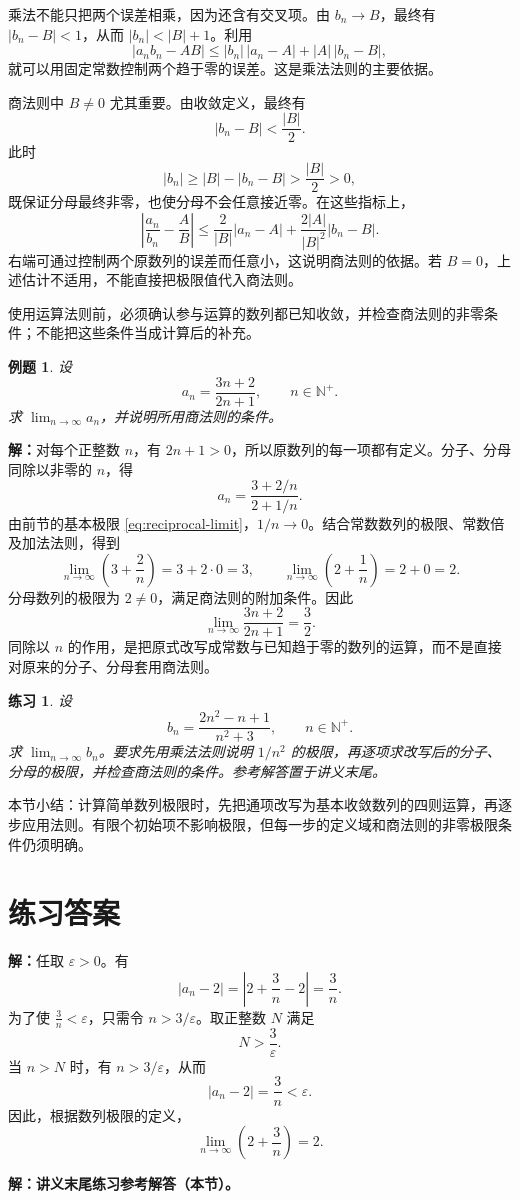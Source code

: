 \documentclass[UTF8,fontset=fandol,11pt]{ctexart}
\newtheorem{example}[definition]{例题}
\newtheorem{exercise}[definition]{练习}
\begin{document}
乘法不能只把两个误差相乘，因为还含有交叉项。由 $b_n\to B$，最终有 $|b_n-B|<1$，从而 $|b_n|<|B|+1$。利用
\[
|a_nb_n-AB|
\leq |b_n|\,|a_n-A|+|A|\,|b_n-B|,
\]
就可以用固定常数控制两个趋于零的误差。这是乘法法则的主要依据。

商法则中 $B\ne0$ 尤其重要。由收敛定义，最终有
\[
|b_n-B|<\frac{|B|}{2}.
\]
此时
\[
|b_n|\geq |B|-|b_n-B|>\frac{|B|}{2}>0,
\]
既保证分母最终非零，也使分母不会任意接近零。在这些指标上，
\[
\left|\frac{a_n}{b_n}-\frac{A}{B}\right|
\leq \frac{2}{|B|}|a_n-A|
+\frac{2|A|}{|B|^2}|b_n-B|.
\]
右端可通过控制两个原数列的误差而任意小，这说明商法则的依据。若 $B=0$，上述估计不适用，不能直接把极限值代入商法则。

使用运算法则前，必须确认参与运算的数列都已知收敛，并检查商法则的非零条件；不能把这些条件当成计算后的补充。\par
\begin{example}
设
\[
a_n=\frac{3n+2}{2n+1},\qquad n\in\mathbb{N}^+.
\]
求 $\lim_{n\to\infty}a_n$，并说明所用商法则的条件。
\end{example}
\par\noindent\textbf{解：}对每个正整数 $n$，有 $2n+1>0$，所以原数列的每一项都有定义。分子、分母同除以非零的 $n$，得
\[
a_n=\frac{3+2/n}{2+1/n}.
\]
由前节的基本极限 \eqref{eq:reciprocal-limit}，$1/n\to0$。结合常数数列的极限、常数倍及加法法则，得到
\[
\lim_{n\to\infty}\left(3+\frac{2}{n}\right)=3+2\cdot0=3,
\qquad
\lim_{n\to\infty}\left(2+\frac{1}{n}\right)=2+0=2.
\]
分母数列的极限为 $2\ne0$，满足商法则的附加条件。因此
\[
\lim_{n\to\infty}\frac{3n+2}{2n+1}=\frac{3}{2}.
\]
同除以 $n$ 的作用，是把原式改写成常数与已知趋于零的数列的运算，而不是直接对原来的分子、分母套用商法则。\par
\begin{exercise}
设
\[
b_n=\frac{2n^2-n+1}{n^2+3},\qquad n\in\mathbb{N}^+.
\]
求 $\lim_{n\to\infty}b_n$。要求先用乘法法则说明 $1/n^2$ 的极限，再逐项求改写后的分子、分母的极限，并检查商法则的条件。参考解答置于讲义末尾。
\end{exercise}
本节小结：计算简单数列极限时，先把通项改写为基本收敛数列的四则运算，再逐步应用法则。有限个初始项不影响极限，但每一步的定义域和商法则的非零极限条件仍须明确。\par
\section*{练习答案}
\par\noindent\textbf{解：}任取 $\varepsilon>0$。有
\[
\left|a_n-2\right|=\left|2+\frac{3}{n}-2\right|=\frac{3}{n}.
\]
为了使 $\frac{3}{n}<\varepsilon$，只需令 $n>3/\varepsilon$。取正整数 $N$ 满足
\[
N>\frac{3}{\varepsilon}.
\]
当 $n>N$ 时，有 $n>3/\varepsilon$，从而
\[
\left|a_n-2\right|=\frac{3}{n}<\varepsilon.
\]
因此，根据数列极限的定义，
\[
\lim_{n\to\infty}\left(2+\frac{3}{n}\right)=2.
\]\par
\par\noindent\textbf{解：}\textbf{讲义末尾练习参考解答（本节）。}
\end{document}
